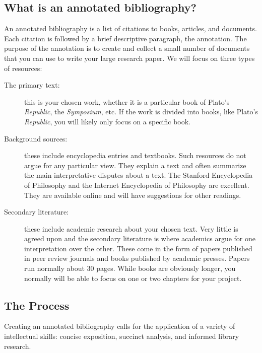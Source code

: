 \documentclass[oneside]{article}
\begin{document}
\subsection*{What is an annotated bibliography?}\label{header-n11}

An annotated bibliography is a list of citations to books, articles, and
documents. Each citation is followed by a brief descriptive paragraph, the annotation. The purpose of the annotation is to create and collect a small number of documents that you can
 use to write your large research paper. We will focus on three
types of resources:

\begin{description}
\item[The primary text:] this is your chosen work, whether it is a particular
  book of Plato's \emph{Republic}, the \emph{Symposium}, etc. If the
  work is divided into books, like Plato's \emph{Republic}, you will
  likely only focus on a specific book.
\item[Background sources:] these include encyclopedia entries and textbooks.
  Such resources do not argue for any particular view. They explain a
  text and often summarize the main interpretative disputes about a
  text. The Stanford Encyclopedia of Philosophy and the Internet
  Encyclopedia of Philosophy are excellent. They are available online
  and will have suggestions for other readings.
\item[Secondary literature:] these include academic research about your
  chosen text. Very little is agreed upon and the secondary literature
  is where academics argue for one interpretation over the other. These
  come in the form of papers published in peer review journals and books
  published by academic presses. Papers run normally about 30 pages.
  While books are obviously longer, you normally will be able to focus
  on one or two chapters for your project.
\end{description}


\subsection*{The Process}\label{header-n16}

Creating an annotated bibliography calls for the application of a
variety of intellectual skills: concise exposition, succinct analysis,
and informed library research.
\end{document}
